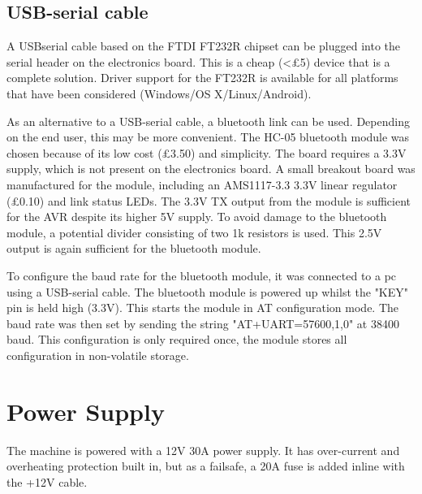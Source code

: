 \subsection{USB-serial cable}
A USBserial cable based on the FTDI FT232R chipset can be plugged into the serial header on the electronics board. This is a cheap (<\pounds 5) device that is 
a complete solution. Driver support for the FT232R is available for all platforms that have been considered (Windows/OS X/Linux/Android).



As an alternative to a USB-serial cable, a bluetooth link can be used. Depending on the end user, this may be more convenient. The HC-05 bluetooth module was
chosen because of its low cost (\pounds 3.50) and simplicity. The board requires a 3.3V supply, which is not present on the electronics board. A small
breakout board was manufactured for the module, including an AMS1117-3.3 3.3V linear regulator (\pounds 0.10) and link status LEDs. The 3.3V TX output from the module is sufficient
for the AVR despite its higher 5V supply. To avoid damage to the bluetooth module, a potential divider consisting of two 1k resistors is used. This 2.5V output is
again sufficient for the bluetooth module.

To configure the baud rate for the bluetooth module, it was connected to a pc using a USB-serial cable. The bluetooth module is powered up whilst the "KEY" pin is held high (3.3V).
This starts the module in AT configuration mode. The baud rate was then set by sending the string "AT+UART=57600,1,0" at 38400 baud. This configuration is only required once,
the module stores all configuration in non-volatile storage.

\section{Power Supply}
The machine is powered with a 12V 30A power supply. It has over-current and overheating protection built in, but as a failsafe, a 20A fuse is added inline with the +12V cable. 

